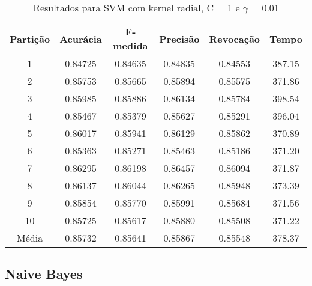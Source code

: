 \begin{table}[h]
\centering
\caption{Resultados para SVM com kernel radial, C = 1 e \(\gamma\) =  0.01}
\vspace{0.2cm}
\begin{tabular}{c|c|c|c|c|c}
Partição & Acurácia & F-medida & Precisão & Revocação & Tempo \\
\hline
1  & 0.84725 & 0.84635 & 0.84835 & 0.84553 & 387.15 \\ 
2  & 0.85753 & 0.85665 & 0.85894 & 0.85575 & 371.86 \\
3  & 0.85985 & 0.85886 & 0.86134 & 0.85784 & 398.54 \\
4  & 0.85467 & 0.85379 & 0.85627 & 0.85291 & 396.04 \\
5  & 0.86017 & 0.85941 & 0.86129 & 0.85862 & 370.89 \\
6  & 0.85363 & 0.85271 & 0.85463 & 0.85186 & 371.20 \\
7  & 0.86295 & 0.86198 & 0.86457 & 0.86094 & 371.87 \\
8  & 0.86137 & 0.86044 & 0.86265 & 0.85948 & 373.39 \\
9  & 0.85854 & 0.85770 & 0.85991 & 0.85684 & 371.56 \\
10 & 0.85725 & 0.85617 & 0.85880 & 0.85508 & 371.22 \\
\hline
Média & 0.85732 & 0.85641 & 0.85867 & 0.85548 & 378.37 \\

\end{tabular} 
\label{table:resultadosSVMRadial}
\end{table}

\subsection{Naive Bayes}

